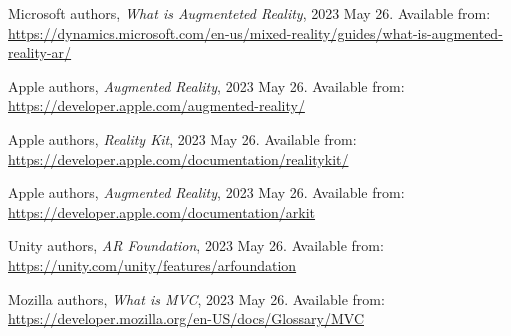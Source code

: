 \documentclass[a4paper,oneside]{article}
\begin{document}
\begin{thebibliography}{9}
  \label{sec:tanulm-irod-jegyz}

   Microsoft authors, \emph{What is Augmenteted Reality}, 2023 May 26.  Available
  from: \\ \url{https://dynamics.microsoft.com/en-us/mixed-reality/guides/what-is-augmented-reality-ar/}

   Apple authors, \emph{Augmented Reality}, 2023 May 26.  Available
  from: \\ \url{https://developer.apple.com/augmented-reality/}

   Apple authors, \emph{Reality Kit}, 2023 May 26.  Available
  from: \\ \url{https://developer.apple.com/documentation/realitykit/}

   Apple authors, \emph{Augmented Reality}, 2023 May 26.  Available
  from: \\ \url{https://developer.apple.com/documentation/arkit}

   Unity authors, \emph{AR Foundation}, 2023 May 26.  Available
  from: \\ \url{https://unity.com/unity/features/arfoundation}

   Mozilla authors, \emph{What is MVC}, 2023 May 26.  Available
  from: \\ \url{https://developer.mozilla.org/en-US/docs/Glossary/MVC}


\end{thebibliography}
\end{document}
